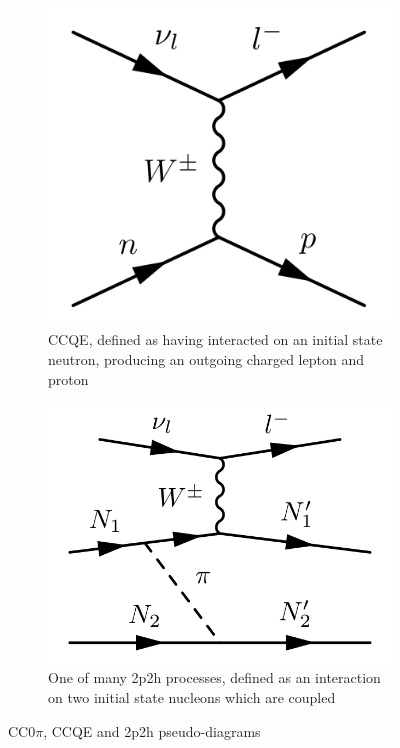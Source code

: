 \begin{figure}[h]
\begin{subfigure}[t]{0.32\textwidth}
		\includegraphics[width=\textwidth, trim={0mm 0mm 0mm 0mm}, clip,page=1]{figures/niwg/diagrams/CCQE}
		\caption{CCQE, defined as having interacted on an initial state neutron, producing an outgoing charged lepton and proton}
	\end{subfigure}
	\begin{subfigure}[t]{0.32\textwidth}
		\includegraphics[width=\textwidth, trim={0mm 0mm 0mm 0mm}, clip,page=1]{figures/niwg/diagrams/2p2h_possibly}
		\caption{One of many 2p2h processes, defined as an interaction on two initial state nucleons which are coupled}
	\end{subfigure}
	\caption{CC0$\pi$, CCQE and 2p2h pseudo-diagrams}
	\label{fig:cc0pi_diag}
\end{figure}

